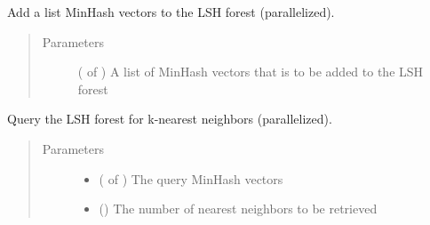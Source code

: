 \documentclass[letterpaper,10pt,english]{sphinxmanual}
\begin{document}
\begin{fulllineitems}
\begin{fulllineitems}
\begin{quote}
\begin{description}
\end{description}\end{quote}

\end{fulllineitems}


\begin{fulllineitems}
\label{\detokenize{documentation:tmap.LSHForest.batch_add}}
Add a list MinHash vectors to the LSH forest (parallelized).
\begin{quote}\begin{description}
\item[{Parameters}] \leavevmode
{} ( of ) \textendash{} A list of MinHash vectors that is to be added to the LSH forest

\end{description}\end{quote}

\end{fulllineitems}


\begin{fulllineitems}
\label{\detokenize{documentation:tmap.LSHForest.batch_query}}
Query the LSH forest for k-nearest neighbors (parallelized).
\begin{quote}\begin{description}
\item[{Parameters}] \leavevmode\begin{itemize}
\item {} 
 ( of ) \textendash{} The query MinHash vectors

\item {} 
 () \textendash{} The number of nearest neighbors to be retrieved


\end{itemize}
\end{description}
\end{quote}
\end{fulllineitems}
\end{fulllineitems}
\end{document}
